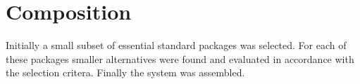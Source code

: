 \section{Composition}\label{Composition}

Initially a small subset of essential standard packages was selected. For each of these packages smaller alternatives were found and evaluated in accordance with the selection critera. Finally the system was assembled.
